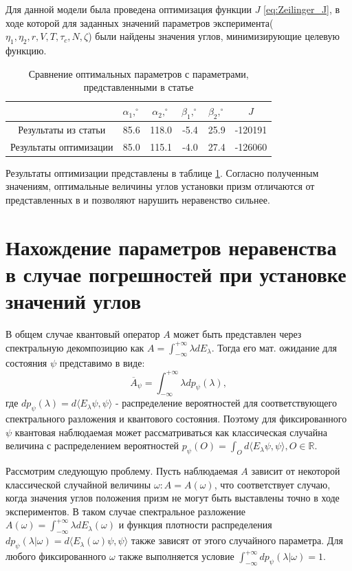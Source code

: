 \documentclass[%
master,         %
subf,           %
href,           %
colorlinks=true %
]{disser}
\numberwithin{equation}{section}
\numberwithin{figure}{section}
\begin{document}
Для данной модели была проведена оптимизация функции $J$ \eqref{eq:Zeilinger_J}, в ходе которой для заданных значений параметров эксперимента($\eta_1, \eta_2, r, V, T, \tau_c, N, \zeta$) были найдены значения углов, минимизирующие целевую функцию.

\begin{table}
\begin{tabular}{|c|c|c|c|c|c|}
\hline 
 & $\alpha_1, ^\circ$ & $\alpha_2, ^\circ$ & $\beta_1, ^\circ$ & $\beta_2, ^\circ$ & $J$ \\ 
\hline 
Результаты из статьи & 85.6 & 118.0 & -5.4 & 25.9 & -120191 \\ 
\hline 
Результаты оптимизации & 85.0 & 115.1 & -4.0 & 27.4 & -126060 \\ 
\hline 
\end{tabular}
\caption{Сравнение оптимальных параметров с параметрами, представленными в статье \cite{Zeilinger}}
\label{tab:Zeilinger_parameters}
\end{table}

Результаты оптимизации представлены в таблице \ref{tab:Zeilinger_parameters}. Согласно полученным значениям, оптимальные величины углов установки призм отличаются от представленных в \cite{Zeilinger} и позволяют нарушить неравенство сильнее.

\section{Нахождение параметров неравенства в случае погрешностей при установке значений углов}
В общем случае квантовый оператор $A$ может быть представлен через спектральную декомпозицию как $A = \int_{-\infty}^{+\infty}\lambda dE_\lambda$. Тогда его мат. ожидание для состояния $\psi$ представимо в виде:
\[
\overline{A}_\psi = \int_{-\infty}^{+\infty}\lambda dp_\psi (\lambda),
\]
где $dp_\psi (\lambda) = d\langle E_\lambda\psi, \psi\rangle$ - распределение вероятностей для соответствующего спектрального разложения и квантового состояния. Поэтому для фиксированного $\psi$ квантовая наблюдаемая может рассматриваться как классическая случайна величина с распределением вероятностей
$p_\psi (O) = \int_O d\langle E_\lambda\psi, \psi\rangle, O\in \mathbb{R}$.

Рассмотрим следующую проблему. Пусть наблюдаемая $A$ зависит от некоторой классической случайной величины $\omega: A = A(\omega)$, что соответствует случаю, когда значения углов положения призм не могут быть выставлены точно в ходе экспериментов. В таком случае спектральное разложение $A(\omega) = \int_{-\infty}^{+\infty}\lambda dE_\lambda(\omega)$ и функция плотности распределения $dp_\psi (\lambda|\omega) = d\langle E_\lambda(\omega)\psi, \psi\rangle$ также зависят от этого случайного параметра. Для любого фиксированного $\omega$ также выполняется условие $\int_{-\infty}^{+\infty}dp_\psi (\lambda|\omega) = 1$.
\end{document}
